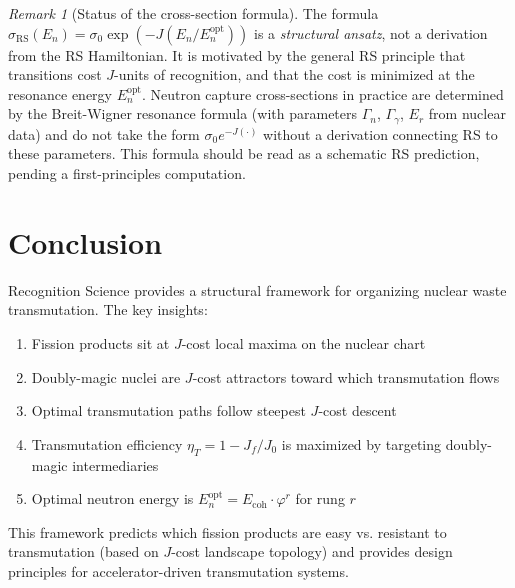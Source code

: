 \documentclass[12pt,a4paper]{article}
\theoremstyle{definition}
\theoremstyle{remark}
\newtheorem{remark}[theorem]{Remark}
\begin{document}
\begin{remark}[Status of the cross-section formula]
The formula $\sigma_\mathrm{RS}(E_n) = \sigma_0 \exp(-J(E_n/E_n^\mathrm{opt}))$
is a \emph{structural ansatz}, not a derivation from the RS Hamiltonian.
It is motivated by the general RS principle that transitions cost $J$-units of
recognition, and that the cost is minimized at the resonance energy
$E_n^\mathrm{opt}$.  Neutron capture cross-sections in practice are determined
by the Breit-Wigner resonance formula (with parameters $\Gamma_n$, $\Gamma_\gamma$,
$E_r$ from nuclear data) and do not take the form $\sigma_0 e^{-J(\cdot)}$ without
a derivation connecting RS to these parameters.  This formula should be read as
a schematic RS prediction, pending a first-principles computation.
\end{remark}

\section{Conclusion}

Recognition Science provides a structural framework for organizing nuclear waste transmutation.
The key insights:
\begin{enumerate}
\item Fission products sit at $J$-cost local maxima on the nuclear chart
\item Doubly-magic nuclei are $J$-cost attractors toward which transmutation flows
\item Optimal transmutation paths follow steepest $J$-cost descent
\item Transmutation efficiency $\eta_T = 1 - J_f/J_0$ is maximized by targeting doubly-magic intermediaries
\item Optimal neutron energy is $E_n^\mathrm{opt} = E_\mathrm{coh} \cdot \varphi^r$ for rung $r$
\end{enumerate}

This framework predicts which fission products are easy vs. resistant to transmutation 
(based on $J$-cost landscape topology) and provides design principles for accelerator-driven 
transmutation systems.
\end{document}
